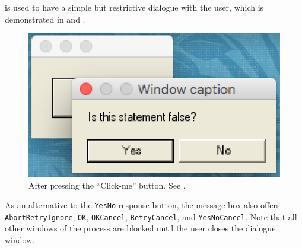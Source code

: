 \documentclass[fsharpNotes.tex]{subfiles}
\begin{document}
 is used to have a simple but restrictive dialogue with the user, which is demonstrated in  and .
%
%
\begin{figure}
  \centering
  \includegraphics[scale=0.5]{MessageBox}
  \caption{After pressing the ``Click-me'' button. See .}
  \label{fig:MessageBox}
\end{figure}
%
As an alternative to the \lstinline{YesNo} response button, the message box also offers \lstinline{AbortRetryIgnore}, \lstinline{OK}, \lstinline{OKCancel}, \lstinline{RetryCancel}, and \lstinline{YesNoCancel}. Note that all other windows of the process are blocked until the user closes the dialogue window.
\end{document}
